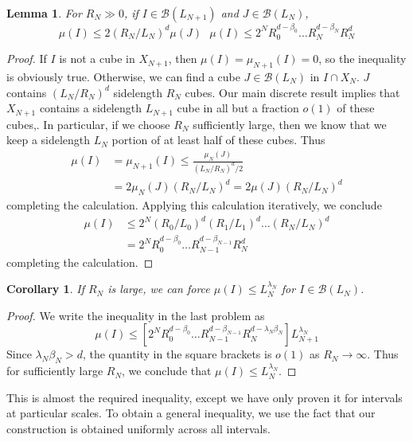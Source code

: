 \documentclass{article}
\theoremstyle{plain}
\newtheorem{lemma}{Lemma}
\newtheorem*{corollary}{Corollary}
\theoremstyle{plain}
\begin{document}
\begin{multicols}{2}
\begin{lemma}
	For $R_N \gg 0$, if $I \in \mathcal{B}(L_{N+1})$ and $J \in \mathcal{B}(L_N)$,
	\[ \mu(I) \leq 2 (R_N/L_N)^d \mu(J)\ \ \ \mu(I) \leq 2^N R_0^{d - \beta_0} \dots R_N^{d - \beta_N} R_N^d \]
\end{lemma}
\begin{proof}
	If $I$ is not a cube in $X_{N+1}$, then $\mu(I) = \mu_{N+1}(I) = 0$, so the inequality is obviously true. Otherwise, we can find a cube $J \in \mathcal{B}(L_N)$ in $I \cap X_N$. $J$ contains $(L_N/R_N)^d$ sidelength $R_N$ cubes. Our main discrete result implies that $X_{N+1}$ contains a sidelength $L_{N+1}$ cube in all but a fraction $o(1)$ of these cubes,. In particular, if we choose $R_N$ sufficiently large, then we know that we keep a sidelength $L_N$ portion of at least half of these cubes. Thus
	\begin{align*}
		\mu(I) &= \mu_{N+1}(I) \leq \frac{\mu_N(J)}{(L_N/R_N)^d/2}\\
		&= 2 \mu_N(J) (R_N/L_N)^d = 2 \mu(J) (R_N/L_N)^d
	\end{align*}
	completing the calculation. Applying this calculation iteratively, we conclude
	\begin{align*}
		\mu(I) &\leq 2^N (R_0/L_0)^d (R_1/L_1)^d \dots (R_N/L_N)^d\\
		&= 2^N R_0^{d - \beta_0} \dots R_{N-1}^{d - \beta_{N-1}} R_N^d
	\end{align*}
	completing the calculation.
\end{proof}

\begin{corollary}
	If $R_N$ is large, we can force $\mu(I) \leq L_N^{\lambda_N}$ for $I \in \mathcal{B}(L_N)$.
\end{corollary}
\begin{proof}
	We write the inequality in the last problem as
	\[ \mu(I) \leq [2^N R_0^{d - \beta_0} \dots R_{N-1}^{d - \beta_{N-1}} R_N^{d - \lambda_N \beta_N}] L_{N+1}^{\lambda_N} \]
	Since $\lambda_N \beta_N > d$, the quantity in the square brackets is $o(1)$ as $R_N \to \infty$. Thus for sufficiently large $R_N$, we conclude that $\mu(I) \leq L_N^{\lambda_N}$.
\end{proof}

This is almost the required inequality, except we have only proven it for intervals at particular scales. To obtain a general inequality, we use the fact that our construction is obtained uniformly across all intervals.


\end{multicols}
\end{document}
